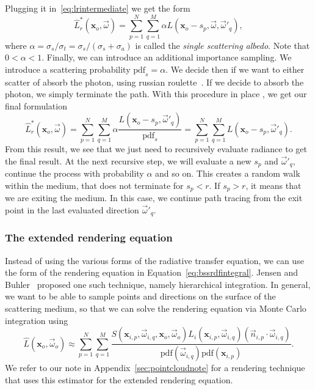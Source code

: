 Plugging it in~\ref{eq:lrintermediate} we get the form
\begin{equation*}
\hat{L}_r^*(\mathbf{x}_o, \vec{\omega}) = \sum_{p=1}^N \sum_{q=1}^M \alpha L(\mathbf{x}_o - s_p, \vec{\omega}, \vec{\omega}'_q),
\end{equation*}
where $\alpha = \sigma_s / \sigma_t = \sigma_s / (\sigma_s + \sigma_a)  $ is called the \emph{single scattering albedo}. Note that $0 < \alpha < 1$.  Finally, we can introduce an additional importance sampling. We introduce a scattering probability $\text{pdf}_s = \alpha$. We decide then if we want to either scatter of absorb the photon, using russian roulette~\cite{Arvo1990}. If we decide to absorb the photon, we simply terminate the path. With this procedure in place , we get our final formulation
\begin{equation*}
\hat{L}_r^*(\mathbf{x}_o, \vec{\omega}) = \sum_{p=1}^N \sum_{q=1}^M\alpha \frac{L(\mathbf{x}_o - s_p, \vec{\omega}'_q)} {\text{pdf}_s} = \sum_{p=1}^N\sum_{q=1}^M L(\mathbf{x}_o - s_p, \vec{\omega}'_q). 
\end{equation*}
From this result, we see that we just need to recursively evaluate radiance to get the final result. At the next recursive step, we will evaluate a new $s_p$ and $\vec{\omega}'_q$, continue the process with probability $\alpha$ and so on. This creates a random walk within the medium, that does not terminate for $s_p < r$. If $s_p > r$, it means that we are exiting the medium. In this case, we continue path tracing from the exit point in the last evaluated direction $\vec{\omega}'_q$.

\subsubsection{The extended rendering equation}

Instead of using the various forms of the radiative transfer equation, we can use the form of the rendering equation in Equation~\ref{eq:bssrdfintegral}. Jensen and Buhler~\cite{Jensen2002} proposed one such technique, namely hierarchical integration. In general, we want to be able to sample points and directions on the surface of the scattering medium, so that we can solve the rendering equation via Monte Carlo integration using
\begin{equation*}
\hat{L}(\mathbf{x}_o, \vec{\omega}_o) \approx \sum_{p = 1}^N \sum_{q = 1}^M \frac{S(\mathbf{x}_{i,p}, \vec{\omega}_{i,q}, \mathbf{x}_o, \vec{\omega}_o) L_i(\mathbf{x}_{i,p}, \vec{\omega}_{i,q}) (\vec{n}_{i,p} \cdot \vec{\omega}_{i,q})}{\text{pdf}(\vec{\omega}_{i,q}) \text{pdf}(\mathbf{x}_{i,p})}.
\end{equation*}
We refer to our note in Appendix~\ref{sec:pointcloudnote} for a rendering technique that uses this estimator for the extended rendering equation.

